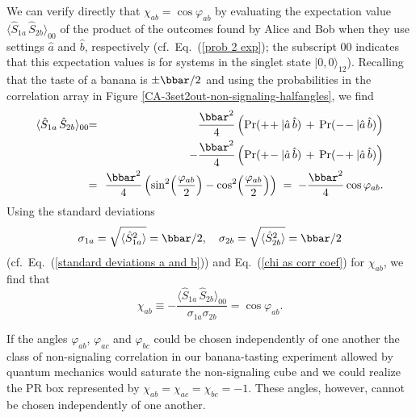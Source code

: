 We can verify directly that $\chi_{ab} = \cos{\varphi_{ab}}$ by evaluating the expectation value $\langle \hat{S}_{1a} \, \hat{S}_{2b} \rangle_{00}$ of the product of the outcomes found by Alice and Bob when they use settings $\hat{a}$ and $\hat{b}$, respectively (cf.\ Eq.\ (\ref{prob 2 exp}); the subscript $00$ indicates that this expectation values is for systems in the singlet state $|0, 0 \rangle_{12}$). Recalling that the taste of a banana is $\pm \bbar/2$ and using the probabilities in the correlation array in Figure \ref{CA-3set2out-non-signaling-halfangles}, we find
\begin{eqnarray}
\langle \hat{S}_{1a} \, \hat{S}_{2b} \rangle_{00} & \!\! = \!\! & \frac{\bbar^2}{4} \left(\mathrm{Pr}(+\!+| \hat{a} \,\hat{b}) \, + \, \mathrm{Pr}(-\!-| \hat{a} \,\hat{b})\right) \nonumber\\
&&- \frac{\bbar^2}{4} \left(\mathrm{Pr}(+\!-| \hat{a} \,\hat{b}) \, + \, \mathrm{Pr}(-\!+| \hat{a} \,\hat{b})\right) \nonumber \\
&  \!\! = \!\! & \frac{\bbar^2}{4} \left(  \sin^2{\!\left(\frac{\varphi_{ab}}{2}\right)} - \cos^2{\!\left(\frac{\varphi_{ab}}{2}\right)} \right) \; = \; -\frac{\bbar^2}{4}\cos{\varphi_{ab}}.
\label{prob 2 exp b}
\end{eqnarray}
Using the standard deviations 
\begin{equation}
\sigma_{1a} = \sqrt{\langle \hat{S}^2_{1a} \rangle} = \bbar/2, \quad \sigma_{2b} = \sqrt{\langle \hat{S}^2_{2b} \rangle} = \bbar/2
\label{standard deviations a b}
\end{equation}
(cf.\ Eq.\ (\ref{standard deviations a and b})) and Eq.\ (\ref{chi as corr coef}) for $\chi_{ab}$, we find that 
\begin{equation}
\chi_{ab} \equiv  - \frac{\langle \hat{S}_{1a} \, \hat{S}_{2b} \rangle_{00}}{\sigma_{1a} \sigma_{2b}}  = \cos{\varphi_{ab}}. 
\label{chi2angle}
\end{equation}    

If the angles $\varphi_{ab}$, $\varphi_{ac}$ and $\varphi_{bc}$ could be chosen independently of one another the class of non-signaling correlation in our banana-tasting experiment allowed by quantum mechanics would saturate the non-signaling cube and we could realize the PR box represented by $\chi_{ab} = \chi_{ac} = \chi_{bc} = -1$. These angles, however, cannot be chosen independently of one another. 

